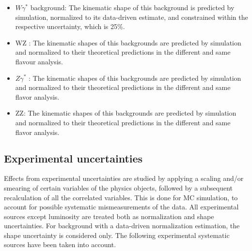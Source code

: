 \begin{itemize}
\item $W \gamma^*$ background: The kinematic shape of this background is predicted by simulation, normalized to its data-driven estimate, and constrained within the respective
uncertainty, which is 25\%.
\item WZ : The kinematic shapes of this backgrounds are predicted by simulation and
normalized to their theoretical predictions in the different and same flavour analysis.

\item $ Z \gamma^*$  : The kinematic shapes of this backgrounds are predicted by simulation and
normalized to their theoretical predictions in the different and same flavor analysis.

\item ZZ: The kinematic shapes of this backgrounds are predicted by simulation and normalized to their theoretical predictions in the different and same flavor analysis.

\end{itemize}


\subsection*{Experimental uncertainties}
Effects from experimental uncertainties are studied by applying a scaling and/or smearing of
certain variables of the physics objects, followed by a subsequent recalculation of all the correlated variables. This is done for MC simulation, to account for possible systematic mismeasurements of the data. All experimental sources except luminosity are treated both as normalization and shape uncertainties. For background with a data-driven normalization estimation,
the shape uncertainty is considered only. 
The following experimental systematic sources have been taken into account.

